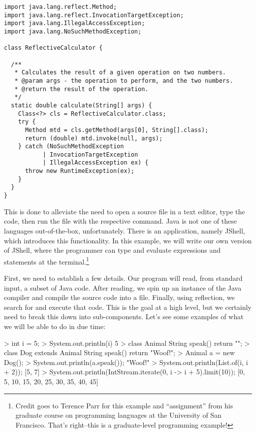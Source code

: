 \begin{lstlisting}[language=MyJava]
import java.lang.reflect.Method;
import java.lang.reflect.InvocationTargetException;
import java.lang.IllegalAccessException;
import java.lang.NoSuchMethodException;

class ReflectiveCalculator {

  /**
   * Calculates the result of a given operation on two numbers.
   * @param args - the operation to perform, and the two numbers.
   * @return the result of the operation.
   */
  static double calculate(String[] args) {
    Class<?> cls = ReflectiveCalculator.class;
    try {
      Method mtd = cls.getMethod(args[0], String[].class);
      return (double) mtd.invoke(null, args);
    } catch (NoSuchMethodException
           | InvocationTargetException
           | IllegalAccessException ex) {
      throw new RuntimeException(ex);
    }
  }
}
\end{lstlisting}

This is done to alleviate the need to open a source file in a text editor, type the code, then run the file with the respective command. 
Java is not one of these languages out-of-the-box, unfortunately. 
There is an application, namely JShell, which introduces this functionality. 
In this example, we will write our own version of JShell, where the programmer can type and evaluate expressions and statements at the terminal.\footnote{Credit goes to Terence Parr for this example and ``assignment'' from his graduate course on programming languages at the University of San Francisco. That's right--this is a graduate-level programming example!}

First, we need to establish a few details. 
Our program will read, from standard input, a subset of Java code. 
After reading, we spin up an instance of the Java compiler and compile the source code into a  file. 
Finally, using reflection, we search for and execute that code. 
This is the goal at a high level, but we certainly need to break this down into sub-components. 
Let's see some examples of what we will be able to do in due time:

\begin{verbnobox}[\small]
> int i = 5;
> System.out.println(i)
5
> class Animal { String speak() { return ""; }}
> class Dog extends Animal { String speak() { return "Woof!"; }}
> Animal a = new Dog();
> System.out.println(a.speak());
"Woof!"
> System.out.println(List.of(i, i + 2));
[5, 7]
> System.out.println(IntStream.iterate(0, i -> i + 5).limit(10));
[0, 5, 10, 15, 20, 25, 30, 35, 40, 45]
\end{verbnobox}


